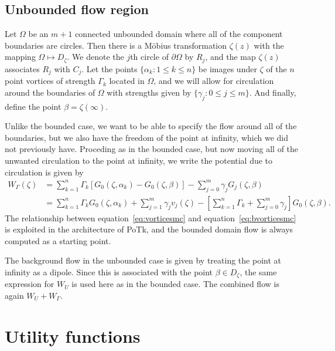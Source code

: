 \documentclass[12pt,fleqn]{article}
\begin{document}
\subsection{Unbounded flow region}
Let $\Omega$ be an $m+1$ connected unbounded domain where all of the component boundaries are circles. Then there is a M\"obius transformation $\zeta(z)$ with the mapping $\Omega\mapsto D_\zeta$. We denote the $j$th circle of $\partial\Omega$ by $R_j$, and the map $\zeta(z)$ associates $R_j$ with $C_j$. Let the points $\{\alpha_k:1\le k\le n\}$ be images under $\zeta$ of the $n$ point vortices of strength $\Gamma_k$ located in $\Omega$, and we will allow for circulation around the boundaries of $\Omega$ with strengths given by $\{\gamma_j:0\le j\le m\}$. And finally, define the point $\beta = \zeta(\infty)$.

Unlike the bounded case, we want to be able to specify the flow around all of the boundaries, but we also have the freedom of the point at infinity, which we did not previously have. Proceding as in the bounded case, but now moving all of the unwanted circulation to the point at infinity, we write the potential due to circulation is given by
\begin{equation}
  \begin{split}
    W_\Gamma(\zeta) &= \sum_{k=1}^n \Gamma_k \left[ G_0(\zeta,\alpha_k) - G_0(\zeta,\beta) \right] - \sum_{j=0}^m \gamma_j G_j(\zeta,\beta) \\
    &= \sum_{k=1}^n \Gamma_k G_0(\zeta,\alpha_k) + \sum_{j=1}^m \gamma_j v_j(\zeta) - \left[ \sum_{k=1}^n \Gamma_k + \sum_{j=0}^m \gamma_j \right] G_0(\zeta,\beta).
  \end{split}
  \label{eq:vorticesmc}
\end{equation}
The relationship between equation~\eqref{eq:vorticesmc} and equation~\eqref{eq:bvorticesmc} is exploited in the architecture of PoTk, and the bounded domain flow is always computed as a starting point.

The background flow in the unbounded case is given by treating the point at infinity as a dipole. Since this is associated with the point $\beta\in D_\zeta$, the same expression for $W_U$ is used here as in the bounded case. The combined flow is again $W_U + W_\Gamma$.




\clearpage
\appendix

\section{Utility functions}\label{sec:utility}
\end{document}
